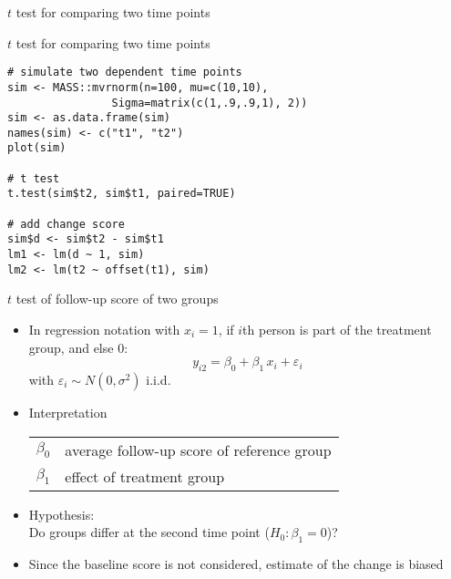 \documentclass{beamer}
\begin{document}
\begin{frame}{$t$ test for comparing two time points}
\begin{center}
\end{center}
\end{frame}

{

\begin{frame}[fragile]{$t$ test for comparing two time points}
\begin{lstlisting}
# simulate two dependent time points
sim <- MASS::mvrnorm(n=100, mu=c(10,10), 
                Sigma=matrix(c(1,.9,.9,1), 2))
sim <- as.data.frame(sim)
names(sim) <- c("t1", "t2")
plot(sim)

# t test
t.test(sim$t2, sim$t1, paired=TRUE)

# add change score
sim$d <- sim$t2 - sim$t1
lm1 <- lm(d ~ 1, sim)
lm2 <- lm(t2 ~ offset(t1), sim)
\end{lstlisting}
\end{frame}

}


\begin{frame}{$t$ test of follow-up score of two groups}
\begin{itemize}
  \item In regression notation with $x_i = 1$, if $i$th person is part of
    the treatment group, and else $0$:
    \[
      y_{i2} = \beta_0 + \beta_1 \, x_i + \varepsilon_i
    \]
    with $\varepsilon_i \sim N(0, \sigma^2)$ i.i.d.
  \item Interpretation
    \begin{center}
    \begin{tabular}{ll}
    $\beta_0$ & average follow-up score of reference group\\
    $\beta_1$ & effect of treatment group
    \end{tabular}
    \end{center}
  \item Hypothesis:\\
        Do groups differ at the second time point ($H_0\colon \beta_1 = 0$)?
  \item Since the baseline score is not considered, estimate of the change
    is biased
\end{itemize}
\end{frame}
\end{document}
